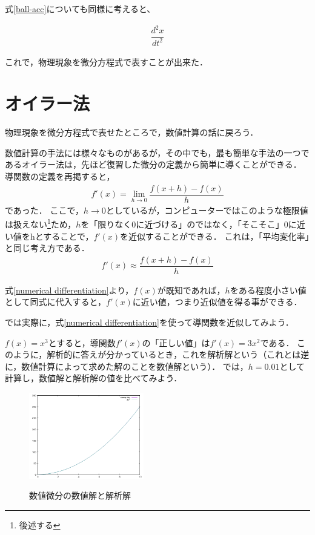式\ref{ball-acc}についても同様に考えると、

\begin{align}
\dfrac{d^2x}{dt^2}
\end{align}



これで，物理現象を微分方程式で表すことが出来た．

\section{オイラー法}
物理現象を微分方程式で表せたところで，数値計算の話に戻ろう．

数値計算の手法には様々なものがあるが，その中でも，最も簡単な手法の一つであるオイラー法は，先ほど復習した微分の定義から簡単に導くことができる．
導関数の定義を再掲すると，
\begin{align}
f'(x) = \lim_{h \to 0} \dfrac{f(x+h)-f(x)}{h}
\end{align}
であった．
ここで，$h \to 0$としているが，コンピューターではこのような極限値は扱えない\footnote{後述する}ため，$h$を「限りなく0に近づける」のではなく，「そこそこ」0に近い値をhとすることで，$f'(x)$を近似することができる．
これは，「平均変化率」と同じ考え方である．
\begin{align}
f'(x) \approx \dfrac{f(x+h)-f(x)}{h}
\label{numerical-differentiation}
\end{align}

式\ref{numerical differentiation}より，$f(x)$が既知であれば，$h$をある程度小さい値として同式に代入すると，$f'(x)$に近い値，つまり近似値を得る事ができる．

では実際に，式\ref{numerical differentiation}を使って導関数を近似してみよう．


$f(x)=x^3$とすると，導関数$f'(x)$の「正しい値」は$f'(x)=3x^2$である．
このように，解析的に答えが分かっているとき，これを解析解という（これとは逆に，数値計算によって求めた解のことを数値解という）．
では，$h=0.01$として計算し，数値解と解析解の値を比べてみよう．
\begin{figure}
\centering
\includegraphics[width=5cm]{numerical-differentiation-graph.png}
\label{numerical-differentiation-graph}
\caption{数値微分の数値解と解析解}
\end{figure}


